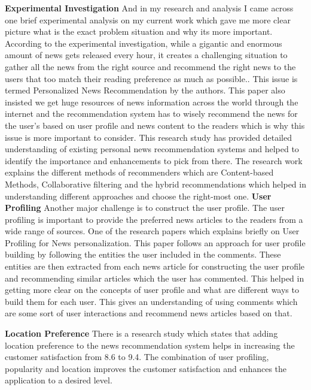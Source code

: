\textbf{Experimental Investigation}\newline
And in my research and analysis I came across one brief experimental analysis on my current work which gave me more clear picture what is the exact problem situation and why its more important. According to the experimental investigation, while a gigantic and enormous amount of news gets released every hour, it creates a challenging situation to gather all the news from the right source and recommend the right news to the users that too match their reading preference as much as possible.\cite{Li2011}. This issue is termed Personalized News Recommendation by the authors. This paper also insisted we get huge resources of news information across the world through the internet and the recommendation system has to wisely recommend the news for the user's based on user profile and news content to the readers which is why this issue is more important to consider. This research study has provided detailed understanding of existing personal news recommendation systems and helped to identify the importance and enhancements to pick from there. 
The research work explains the different methods of recommenders which are Content-based Methods, Collaborative filtering and the hybrid recommendations which helped in understanding different approaches and choose the right-most one.
\newline
\textbf{User Profiling}\newline
Another major challenge is to construct the user profile. The user profiling is important to provide the preferred news articles to the readers from a wide range of sources. One of the research papers which explains briefly on User Profiling for News personalization. This paper follows an approach for user profile building by following the entities the user included in the comments\cite{meguebli2014building}. These entities are then extracted from each news article for constructing the user profile and recommending similar articles which the user has commented. This helped in getting more clear on the concepts of user profile and what are different ways to build them for each user. 
This gives an understanding of using comments which are some sort of user interactions and recommend news articles based on that. \newline

\textbf{Location Preference}\newline
There is a research study which states that adding location preference to the news recommendation system helps in increasing the customer satisfaction from 8.6 to 9.4. The combination of user profiling, popularity and location improves the customer satisfaction and enhances the application to a desired level\cite{Natarajan2016}.\newline

